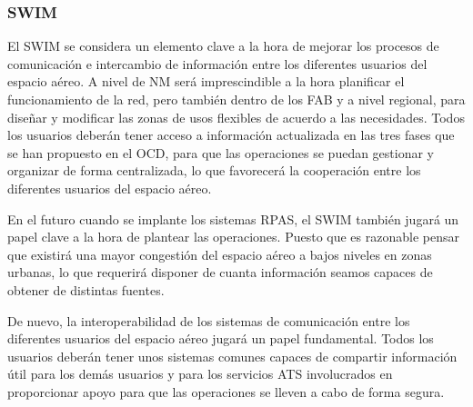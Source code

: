\subsubsection{SWIM}

El SWIM se considera un elemento clave a la hora de mejorar los procesos de comunicación e intercambio de información entre los diferentes usuarios del espacio aéreo. A nivel de NM será imprescindible a la hora planificar el funcionamiento de la red, pero también dentro de los FAB y a nivel regional, para diseñar y modificar las zonas de usos flexibles de acuerdo a las necesidades. Todos los usuarios deberán tener acceso a información actualizada en las tres fases que se han propuesto en el OCD, para que las operaciones se puedan gestionar y organizar de forma centralizada, lo que favorecerá la cooperación entre los diferentes usuarios del espacio aéreo.

En el futuro cuando se implante los sistemas RPAS, el SWIM también jugará un papel clave a la hora de plantear las operaciones. Puesto que es razonable pensar que existirá una mayor congestión del espacio aéreo a bajos niveles en zonas urbanas, lo que requerirá disponer de cuanta información seamos capaces de obtener de distintas fuentes.

De nuevo, la interoperabilidad de los sistemas de comunicación entre los diferentes usuarios del espacio aéreo jugará un papel fundamental. Todos los usuarios deberán tener unos sistemas comunes capaces de compartir información útil para los demás usuarios y para los servicios ATS involucrados en proporcionar apoyo para que las operaciones se lleven a cabo de forma segura. 